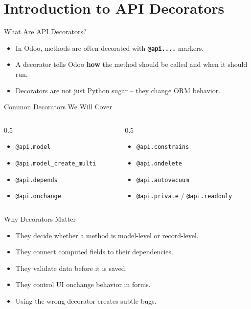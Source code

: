 \section{Introduction to API Decorators}


\begin{frame}{What Are API Decorators?}
	\begin{itemize}
		\item In Odoo, methods are often decorated with \textbf{\texttt{@api....}} markers.
		\item A decorator tells Odoo \textbf{how} the method should be called and when it should run.
		\item Decorators are not just Python sugar -- they change ORM behavior.
	\end{itemize}
\end{frame}

\begin{frame}{Common Decorators We Will Cover}
	\begin{columns}[T]
		\begin{column}{0.5\textwidth}
			\begin{itemize}
				\item \texttt{@api.model}
				\item \texttt{@api.model\_create\_multi}
				\item \texttt{@api.depends}
				\item \texttt{@api.onchange}
			\end{itemize}
		\end{column}
		\begin{column}{0.5\textwidth}
			\begin{itemize}
				\item \texttt{@api.constrains}
				\item \texttt{@api.ondelete}
				\item \texttt{@api.autovacuum}
				\item \texttt{@api.private} / \texttt{@api.readonly}
			\end{itemize}
		\end{column}
	\end{columns}
\end{frame}

\begin{frame}{Why Decorators Matter}
	\begin{itemize}
		\item They decide whether a method is model-level or record-level.
		\item They connect computed fields to their dependencies.
		\item They validate data before it is saved.
		\item They control UI onchange behavior in forms.
		\item Using the wrong decorator creates subtle bugs.
	\end{itemize}
\end{frame}
